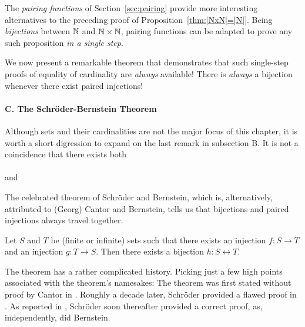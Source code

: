 \medskip

The {\it pairing functions} of Section~\ref{sec:pairing} provide more
interesting alternatives to the preceding proof of
Proposition~\ref{thm:|NxN|=|N|}.  Being {\em bijections} between $\N$
and $\N \times \N$, pairing functions can be adapted to prove any such
proposition {\em in a single step}. 

\medskip

We now present a remarkable theorem that demonstrates that such
single-step proofs of equality of cardinality are {\em always}
available!  There is {\em always} a bijection whenever there exist
paired injections!


\paragraph{\small\sf C. The Schr\"{o}der-Bernstein Theorem}

Although sets and their cardinalities are not the major focus of this
chapter, it is worth a short digression to expand on the last
remark in subsection B.  It is not a coincidence that there
exists both \\
\hspace*{.35in}{\em a bijection between $\N$ and $\N \times \N$} \\
and \\
\hspace*{.35in}{\em an injection from $\N$ to $\N \times \N$ and an
  injection from $\N \times \N$ to $\N$.}

\noindent
The celebrated theorem of Schr\"{o}der and Bernstein,
which is, alternatively, attributed to (Georg) Cantor and Bernstein, 
tells us that bijections and paired injections always travel together.

\begin{theorem}
\label{thm.S-B}
Let $S$ and $T$ be (finite or infinite) sets such that there exists an
injection $f: S \rightarrow T$ and an injection $g: T \rightarrow S$.
Then there exists a bijection $h: S \leftrightarrow T$.
\end{theorem}

The theorem has a rather complicated history.  Picking just a few high
points associated with the theorem's namesakes: The theorem was first
stated without proof by Cantor in \cite{Cantor87}.  Roughly a decade
later, Schr\"{o}der provided a flawed proof in \cite{Schroeder98a}.
As reported in \cite{Deiser2010}, Schr\"{o}der soon thereafter
provided a correct proof, as, independently, did Bernstein.

